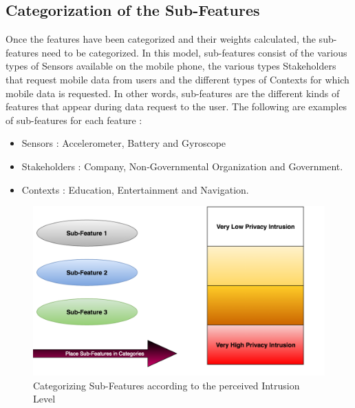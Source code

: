 \subsection{Categorization of the Sub-Features}
Once the features have been categorized and their weights calculated, the sub-features need to be categorized. In this model, sub-features consist
of the various types of Sensors available on the mobile phone, the various types Stakeholders that request mobile data from users and the different types of Contexts for which mobile data is requested. In other words, sub-features are the different kinds of features that appear during data request to the user. The following are examples of sub-features for each feature :

\begin{itemize}
\item Sensors : Accelerometer, Battery and Gyroscope
\item Stakeholders : Company, Non-Governmental Organization and Government.
\item Contexts : Education, Entertainment and Navigation.
\end{itemize}

\begin{figure}[ht!]
\centering
\includegraphics[width=\textwidth,keepaspectratio]{./images/categorize_sub}
\caption{Categorizing Sub-Features according to the perceived Intrusion Level \label{categorize_sub}}
\end{figure}

